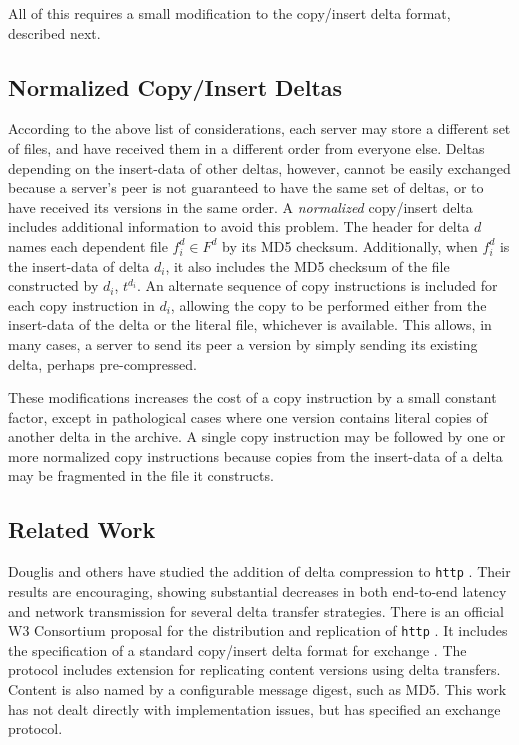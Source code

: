 \documentclass{llncs}
\begin{document}
All of this requires a small modification to the copy/insert delta
format, described next.

\subsection{Normalized Copy/Insert Deltas}

According to the above list of considerations, each server may store a
different set of files, and have received them in a different order
from everyone else.  Deltas depending on the insert-data of other
deltas, however, cannot be easily exchanged because a server's peer is
not guaranteed to have the same set of deltas, or to have received its
versions in the same order.  A \emph{normalized} copy/insert delta
includes additional information to avoid this problem.  The header for
delta $d$ names each dependent file $f^d_i \in F^d$ by its MD5
checksum.  Additionally, when $f^d_i$ is the insert-data of delta
$d_i$, it also includes the MD5 checksum of the file constructed by
$d_i$, $t^{d_i}$.  An alternate sequence of copy instructions is
included for each copy instruction in $d_i$, allowing the copy to be
performed either from the insert-data of the delta or the literal
file, whichever is available.  This allows, in many cases, a server to
send its peer a version by simply sending its existing delta, perhaps
pre-compressed.

These modifications increases the cost of a copy instruction by a
small constant factor, except in pathological cases where one version
contains literal copies of another delta in the archive.  A single
copy instruction may be followed by one or more normalized copy
instructions because copies from the insert-data of a delta may be
fragmented in the file it constructs.

\subsection{Related Work}

Douglis and others have studied the addition of delta compression to
\texttt{http} \cite{SIGCOMM97*181}.  Their results are encouraging,
showing substantial decreases in both end-to-end latency and network
transmission for several delta transfer strategies.  There is an
official W3 Consortium proposal for the distribution and replication
of \texttt{http} \cite{w3}.  It includes the specification of a
standard copy/insert delta format for exchange \cite{gdiff}.  The
protocol includes extension for replicating content versions using
delta transfers.  Content is also named by a configurable message
digest, such as MD5.  This work has not dealt directly with
implementation issues, but has specified an exchange protocol.
\end{document}
